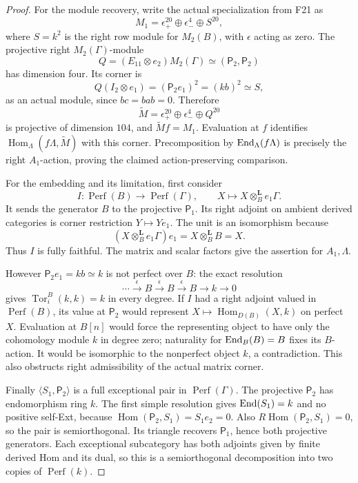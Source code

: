 \documentclass[11pt,a4paper]{article}
\newcommand{\fid}[1]{\textsf{#1}}\newcommand{\gate}[1]{\textsf{#1}}
\theoremstyle{named}\newtheorem{finding}{Finding}[section]
\theoremstyle{definition}\newtheorem{definition}[finding]{Definition}
\theoremstyle{remark}\newtheorem{remark}[finding]{Remark}
\begin{document}
\begin{proof}
For the module recovery, write the actual specialization from
\fid{F21} as
\[
 M_1=\epsilon_+^{20}\oplus\epsilon_-^4\oplus S^{20},
\]
where $S=k^2$ is the right row module for $M_2(B)$, with
$\epsilon$ acting as zero. The projective right $M_2(\Gamma)$-module
\[
 Q=(E_{11}\otimes e_2)M_2(\Gamma)
     \simeq(\mathsf P_2,\mathsf P_2)
\]
has dimension four. Its corner is
\[
 Q(I_2\otimes e_1)=(\mathsf P_2e_1)^2
       =(kb)^2\simeq S,
\]
as an actual module, since $bc=bab=0$. Therefore
\[
 \widetilde M=\epsilon_+^{20}\oplus\epsilon_-^4\oplus Q^{20}
\]
is projective of dimension $104$, and
$\widetilde M f=M_1$. Evaluation at $f$ identifies
$\operatorname{Hom}_\Lambda(f\Lambda,\widetilde M)$ with this
corner. Precomposition by $\operatorname{End}_\Lambda(f\Lambda)$ is precisely
the right $A_1$-action, proving the claimed action-preserving
comparison.

For the embedding and its limitation, first consider
\[
 I:\operatorname{Perf}(B)\longrightarrow\operatorname{Perf}(\Gamma),
 \qquad X\longmapsto X\otimes_B^{\mathbf L}e_1\Gamma.
\]
It sends the generator $B$ to the projective $\mathsf P_1$.
Its right adjoint on ambient derived categories is corner
restriction $Y\mapsto Ye_1$. The unit is an isomorphism because
\[
 (X\otimes_B^{\mathbf L}e_1\Gamma)e_1
       =X\otimes_B^{\mathbf L}B=X.
\]
Thus $I$ is fully faithful. The matrix and scalar factors give
the assertion for $A_1,\Lambda$.

However $\mathsf P_2e_1=kb\simeq k$ is not perfect over $B$:
the exact resolution
\[
 \cdots\xrightarrow{\epsilon}B\xrightarrow{\epsilon}B
   \xrightarrow{\epsilon}B\longrightarrow k\longrightarrow0
\]
gives $\operatorname{Tor}^B_i(k,k)=k$ in every degree.
If $I$ had a right adjoint valued in $\operatorname{Perf}(B)$,
its value at $\mathsf P_2$ would represent
$X\mapsto\operatorname{Hom}_{D(B)}(X,k)$ on perfect $X$.
Evaluation at $B[n]$ would force the representing object to
have only the cohomology module $k$ in degree zero; naturality
for $\operatorname{End}_B(B)=B$ fixes its $B$-action. It would be isomorphic
to the nonperfect object $k$, a contradiction. This also
obstructs right admissibility of the actual matrix corner.

Finally $\langle S_1,\mathsf P_2\rangle$ is a full exceptional
pair in $\operatorname{Perf}(\Gamma)$.
The projective $\mathsf P_2$ has endomorphism ring $k$.
The first simple resolution gives
$\operatorname{End}(S_1)=k$ and no positive self-Ext, because
$\operatorname{Hom}(\mathsf P_2,S_1)=S_1e_2=0$.
Also $R\operatorname{Hom}(\mathsf P_2,S_1)=0$, so the pair
is semiorthogonal. Its triangle recovers $\mathsf P_1$, hence
both projective generators. Each exceptional subcategory has
both adjoints given by finite derived Hom and its dual, so this
is a semiorthogonal decomposition into two copies of
$\operatorname{Perf}(k)$.


\end{proof}
\end{document}
